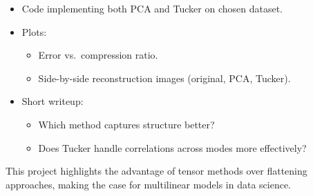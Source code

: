 \documentclass[
  letterpaper,
  DIV=11,
  numbers=noendperiod]{scrreprt}
\providecommand{\tightlist}{%
  \setlength{\itemsep}{0pt}\setlength{\parskip}{0pt}}
\begin{document}
\begin{itemize}
\item
  Code implementing both PCA and Tucker on chosen dataset.
\item
  Plots:

  \begin{itemize}
  \tightlist
  \item
    Error vs.~compression ratio.
  \item
    Side-by-side reconstruction images (original, PCA, Tucker).
  \end{itemize}
\item
  Short writeup:

  \begin{itemize}
  \tightlist
  \item
    Which method captures structure better?
  \item
    Does Tucker handle correlations across modes more effectively?
  \end{itemize}
\end{itemize}

This project highlights the advantage of tensor methods over flattening
approaches, making the case for multilinear models in data science.
\end{document}
